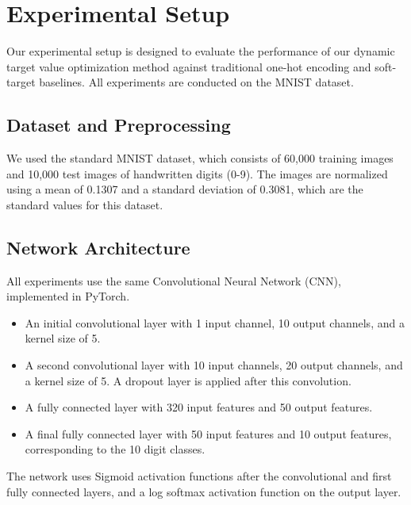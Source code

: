 \documentclass[12pt,fleqn,a4paper]{article}
\begin{document}

\section{Experimental Setup}
 Our experimental setup is designed to evaluate the performance of our dynamic target value optimization method against traditional one-hot encoding and soft-target baselines. All experiments are conducted on the MNIST dataset.

 \subsection{Dataset and Preprocessing}
 We used the standard MNIST dataset, which consists of 60,000 training images and 10,000 test images of handwritten digits (0-9). The images are normalized using a mean of 0.1307 and a standard deviation of 0.3081, which are the standard values for this dataset.

 \subsection{Network Architecture}
All experiments use the same Convolutional Neural Network (CNN), implemented in PyTorch.

 \begin{itemize}
     \item An initial convolutional layer with 1 input channel, 10 output channels, and a kernel size of 5.
     \item A second convolutional layer with 10 input channels, 20 output channels, and a kernel size of 5. A dropout layer is applied after this convolution.
     \item A fully connected layer with 320 input features and 50 output features.
     \item A final fully connected layer with 50 input features and 10 output features, corresponding to the 10 digit classes.
 \end{itemize}
 The network uses Sigmoid activation functions after the convolutional and first fully connected layers, and a log softmax activation function on the output layer.
\end{document}
